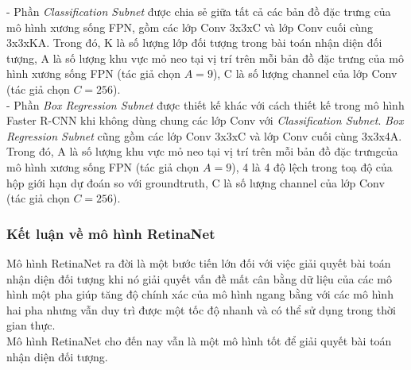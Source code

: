 {    \noindent
    - Phần \textit{Classification Subnet} được chia sẻ giữa tất cả các bản đồ đặc trưng của mô hình xương sống FPN, gồm các lớp Conv 3x3xC và lớp Conv cuối cùng 3x3xKA.
    Trong đó, K là số lượng lớp đối tượng trong bài toán nhận diện đối tượng, A là số lượng khu vực mỏ neo tại vị trí trên mỗi bản đồ đặc trưng của mô hình xương sống FPN (tác giả chọn $A = 9$), C là số lượng channel của lớp Conv (tác giả chọn $C = 256$). \\
    - Phần \textit{Box Regression Subnet} được thiết kế khác với cách thiết kế trong mô hình Faster R-CNN \cite{ren2015faster} khi không dùng chung các lớp Conv với \textit{Classification Subnet}.
    \textit{Box Regression Subnet} cũng gồm các lớp Conv 3x3xC và lớp Conv cuối cùng 3x3x4A.
    Trong đó, A là số lượng khu vực mỏ neo tại vị trí trên mỗi bản đồ đặc trưngcủa mô hình xương sống FPN (tác giả chọn $A = 9$), 4 là 4 độ lệch trong toạ độ của hộp giới hạn dự đoán so với groundtruth, C là số lượng channel của lớp Conv (tác giả chọn $C = 256$).

    \subsubsection*{Kết luận về mô hình RetinaNet}
    Mô hình RetinaNet ra đời là một bước tiến lớn đối với việc giải quyết bài toán nhận diện đối tượng khi nó giải quyết vấn đề mất cân bằng dữ liệu của các mô hình một pha giúp tăng độ chính xác của mô hình ngang bằng với các mô hình hai pha nhưng vẫn duy trì được một tốc độ nhanh và có thể sử dụng trong thời gian thực. \\
    Mô hình RetinaNet cho đến nay vẫn là một mô hình tốt để giải quyết bài toán nhận diện đối tượng.
}